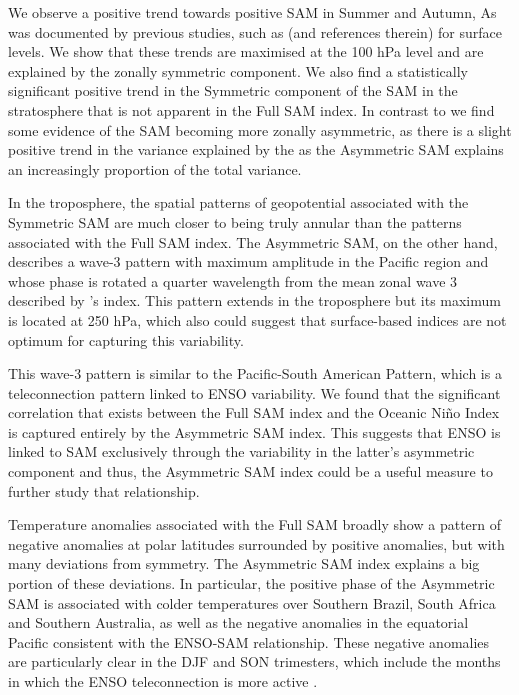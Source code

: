 \documentclass[]{ametsocV5}
\begin{document}
We observe a positive trend towards positive SAM in Summer and Autumn,
As was documented by previous studies, such as \citet{fogt2020} (and
references therein) for surface levels. We show that these trends are
maximised at the 100 hPa level and are explained by the zonally
symmetric component. We also find a statistically significant positive
trend in the Symmetric component of the SAM in the stratosphere that is
not apparent in the Full SAM index. In contrast to \citet{fogt2012} we
find some evidence of the SAM becoming more zonally asymmetric, as there
is a slight positive trend in the variance explained by the as the
Asymmetric SAM explains an increasingly proportion of the total
variance.

In the troposphere, the spatial patterns of geopotential associated with
the Symmetric SAM are much closer to being truly annular than the
patterns associated with the Full SAM index. The Asymmetric SAM, on the
other hand, describes a wave-3 pattern with maximum amplitude in the
Pacific region and whose phase is rotated a quarter wavelength from the
mean zonal wave 3 described by \citet{raphael2004}'s index. This pattern
extends in the troposphere but its maximum is located at 250 hPa, which
also could suggest that surface-based indices are not optimum for
capturing this variability.

This wave-3 pattern is similar to the Pacific-South American Pattern,
which is a teleconnection pattern linked to ENSO variability. We found
that the significant correlation that exists between the Full SAM index
and the Oceanic Niño Index is captured entirely by the Asymmetric SAM
index. This suggests that ENSO is linked to SAM exclusively through the
variability in the latter's asymmetric component and thus, the
Asymmetric SAM index could be a useful measure to further study that
relationship.

Temperature anomalies associated with the Full SAM broadly show a
pattern of negative anomalies at polar latitudes surrounded by positive
anomalies, but with many deviations from symmetry. The Asymmetric SAM
index explains a big portion of these deviations. In particular, the
positive phase of the Asymmetric SAM is associated with colder
temperatures over Southern Brazil, South Africa and Southern Australia,
as well as the negative anomalies in the equatorial Pacific consistent
with the ENSO-SAM relationship. These negative anomalies are
particularly clear in the DJF and SON trimesters, which include the
months in which the ENSO teleconnection is more active
\citep{cazes-boezio2003, fogt2011, cai2020a}.
\end{document}
